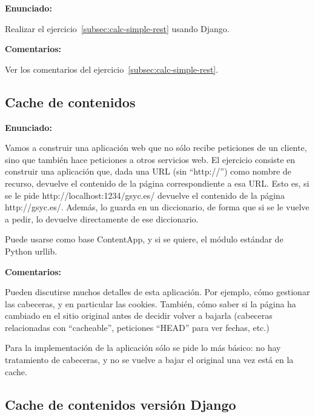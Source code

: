 \textbf{Enunciado:}

Realizar el ejercicio~\ref{subsec:calc-simple-rest} usando Django.

\textbf{Comentarios:}

Ver los comentarios del ejercicio~\ref{subsec:calc-simple-rest}.

\subsection{Cache de contenidos}
\label{subsec:cache-contenidos}

\textbf{Enunciado:}

Vamos a construir una aplicación web que no sólo recibe peticiones de un cliente, sino que también hace peticiones a otros servicios web. El ejercicio consiste en construir una aplicación que, dada una URL (sin ``http://'') como nombre de recurso, devuelve el contenido de la página correspondiente a esa URL. Esto es, si se le pide http://localhost:1234/gsyc.es/ devuelve el contenido de la página http://gsyc.es/. Además, lo guarda en un diccionario, de forma que si se le vuelve a pedir, lo devuelve directamente de ese diccionario.

Puede usarse como base ContentApp, y si se quiere, el módulo estándar de Python urllib.

\textbf{Comentarios:}

Pueden discutirse muchos detalles de esta aplicación. Por ejemplo, cómo gestionar las cabeceras, y en particular las cookies. También, cómo saber si la página ha cambiado en el sitio original antes de decidir volver a bajarla (cabeceras relacionadas con ``cacheable'', peticiones ``HEAD'' para ver fechas, etc.)

Para la implementación de la aplicación sólo se pide lo más básico: no hay tratamiento de cabeceras, y no se vuelve a bajar el original una vez está en la cache.

\subsection{Cache de contenidos versión Django}
\label{subsec:cache-contenidos-django}

